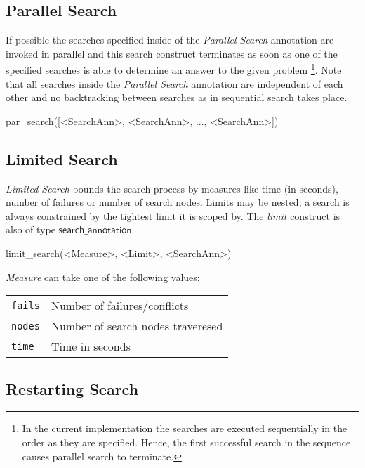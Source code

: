 \documentclass[a4paper]{article}
\newcommand{\fz}[1]{\texttt{#1}}
\newcommand{\fzsf}[1]{\ensuremath{\mathsf{#1}}}
\newcommand{\fzsearchannotation}{\fzsf{search\_annotation}}
\newcommand{\vblabel}[1]	{\large\textbf{#1}}
\begin{document}
\subsection{Parallel Search}

If possible the searches specified inside of the \emph{Parallel Search}
annotation are invoked in parallel and this search construct terminates as soon
as one of the specified searches is able to determine an answer to the given
problem%
\footnote{In the current implementation the searches are executed sequentially
in the order as they are specified.  Hence, the first successful search in the
sequence causes parallel search to terminate.}.
Note that all searches inside the \emph{Parallel Search} annotation are
independent of each other and no backtracking between searches as in sequential
search takes place.

\begin{Zinc}[label={\vblabel{Parallel Search}}]
par_search([<SearchAnn>, <SearchAnn>, ..., <SearchAnn>])
\end{Zinc}


\subsection{Limited Search}

\emph{Limited Search} bounds the search process by measures like time (in
seconds), number of failures or number of search nodes.  Limits may be
nested; a search is always constrained by the tightest limit it is
scoped by.  The \emph{limit} construct is also of type \fzsearchannotation{}.

\begin{Zinc}[label={\vblabel{Limited Search}}]
limit_search(<Measure>, <Limit>, <SearchAnn>)
\end{Zinc}

\emph{Measure} can take one of the following values: 

\begin{tabular}{p{.10\linewidth}p{.6\linewidth}}
\fz{fails} 
& Number of failures/conflicts\\
\fz{nodes} 
& Number of search nodes traveresed\\
\fz{time}
& Time in seconds
\end{tabular}


\subsection{Restarting Search}
\end{document}
